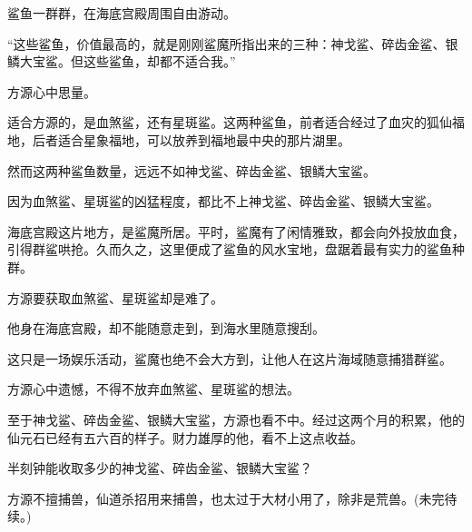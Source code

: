 \begin{this_body}
鲨鱼一群群，在海底宫殿周围自由游动。

“这些鲨鱼，价值最高的，就是刚刚鲨魔所指出来的三种：神戈鲨、碎齿金鲨、银鳞大宝鲨。但这些鲨鱼，却都不适合我。”

方源心中思量。

适合方源的，是血煞鲨，还有星斑鲨。这两种鲨鱼，前者适合经过了血灾的狐仙福地，后者适合星象福地，可以放养到福地最中央的那片湖里。

然而这两种鲨鱼数量，远远不如神戈鲨、碎齿金鲨、银鳞大宝鲨。

因为血煞鲨、星斑鲨的凶猛程度，都比不上神戈鲨、碎齿金鲨、银鳞大宝鲨。

海底宫殿这片地方，是鲨魔所居。平时，鲨魔有了闲情雅致，都会向外投放血食，引得群鲨哄抢。久而久之，这里便成了鲨鱼的风水宝地，盘踞着最有实力的鲨鱼种群。

方源要获取血煞鲨、星斑鲨却是难了。

他身在海底宫殿，却不能随意走到，到海水里随意搜刮。

这只是一场娱乐活动，鲨魔也绝不会大方到，让他人在这片海域随意捕猎群鲨。

方源心中遗憾，不得不放弃血煞鲨、星斑鲨的想法。

至于神戈鲨、碎齿金鲨、银鳞大宝鲨，方源也看不中。经过这两个月的积累，他的仙元石已经有五六百的样子。财力雄厚的他，看不上这点收益。

半刻钟能收取多少的神戈鲨、碎齿金鲨、银鳞大宝鲨？

方源不擅捕兽，仙道杀招用来捕兽，也太过于大材小用了，除非是荒兽。(未完待续。)

\end{this_body}

